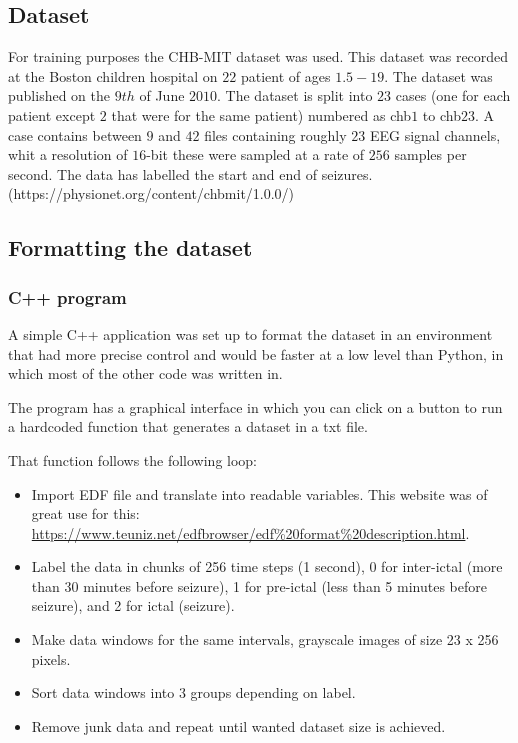 \subsection{Dataset}
For training purposes the CHB-MIT dataset was used. This dataset was recorded at the Boston children hospital on $22$ patient of ages $1.5 - 19$. The dataset was published on the $9th$ of June $2010$. The dataset is split into $23$ cases (one for each patient except $2$ that were for the same patient) numbered as chb$1$ to chb$23$. A case contains between $9$ and $42$ files containing roughly $23$ EEG signal channels, whit a resolution of $16$-bit these were sampled at a rate of $256$ samples per second. The data has labelled the start and end of seizures. (https://physionet.org/content/chbmit/1.0.0/)


\subsection{Formatting the dataset}

\subsubsection{C++ program}

A simple C++ application was set up to format the dataset in an environment that had more precise control and would be faster at a low level than Python, in which most of the other code was written in.

The program has a graphical interface in which you can click on a button to run a hardcoded function that generates a dataset in a txt file.

That function follows the following loop:

%

\begin{itemize}
    \item Import EDF file and translate into readable variables. This website was of great use for this: \url{https://www.teuniz.net/edfbrowser/edf\%20format\%20description.html}.
    \item Label the data in chunks of 256 time steps (1 second), 0 for inter-ictal (more than 30 minutes before seizure), 1 for pre-ictal (less than 5 minutes before seizure), and 2 for ictal (seizure).
    \item Make data windows for the same intervals, grayscale images of size 23 x 256 pixels.
    \item Sort data windows into 3 groups depending on label.
    \item Remove junk data and repeat until wanted dataset size is achieved.
\end{itemize}

